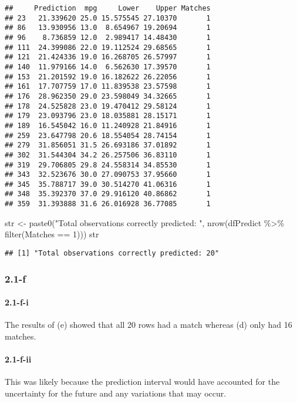 \documentclass[
]{article}
\newenvironment{Shaded}{\begin{snugshade}}{\end{snugshade}}
\newcommand{\DecValTok}[1]{\textcolor[rgb]{0.00,0.00,0.81}{#1}}
\newcommand{\FunctionTok}[1]{\textcolor[rgb]{0.00,0.00,0.00}{#1}}
\newcommand{\NormalTok}[1]{#1}
\newcommand{\OtherTok}[1]{\textcolor[rgb]{0.56,0.35,0.01}{#1}}
\newcommand{\SpecialCharTok}[1]{\textcolor[rgb]{0.00,0.00,0.00}{#1}}
\newcommand{\StringTok}[1]{\textcolor[rgb]{0.31,0.60,0.02}{#1}}
\begin{document}
\begin{verbatim}
##     Prediction  mpg     Lower    Upper Matches
## 23   21.339620 25.0 15.575545 27.10370       1
## 86   13.930956 13.0  8.654967 19.20694       1
## 96    8.736859 12.0  2.989417 14.48430       1
## 111  24.399086 22.0 19.112524 29.68565       1
## 121  21.424336 19.0 16.268705 26.57997       1
## 140  11.979166 14.0  6.562630 17.39570       1
## 153  21.201592 19.0 16.182622 26.22056       1
## 161  17.707759 17.0 11.839538 23.57598       1
## 176  28.962350 29.0 23.598049 34.32665       1
## 178  24.525828 23.0 19.470412 29.58124       1
## 179  23.093796 23.0 18.035881 28.15171       1
## 189  16.545042 16.0 11.240928 21.84916       1
## 259  23.647798 20.6 18.554054 28.74154       1
## 279  31.856051 31.5 26.693186 37.01892       1
## 302  31.544304 34.2 26.257506 36.83110       1
## 319  29.706805 29.8 24.558314 34.85530       1
## 343  32.523676 30.0 27.090753 37.95660       1
## 345  35.788717 39.0 30.514270 41.06316       1
## 348  35.392370 37.0 29.916120 40.86862       1
## 359  31.393888 31.6 26.016928 36.77085       1
\end{verbatim}

\begin{Shaded}
\begin{Highlighting}[]
\NormalTok{str }\OtherTok{\textless{}{-}} \FunctionTok{paste0}\NormalTok{(}\StringTok{"Total observations correctly predicted: "}\NormalTok{, }\FunctionTok{nrow}\NormalTok{(dfPredict }\SpecialCharTok{\%\textgreater{}\%} \FunctionTok{filter}\NormalTok{(Matches }\SpecialCharTok{==} \DecValTok{1}\NormalTok{)))}
\NormalTok{str}
\end{Highlighting}
\end{Shaded}

\begin{verbatim}
## [1] "Total observations correctly predicted: 20"
\end{verbatim}

\hypertarget{f}{%
\subsubsection{2.1-f}\label{f}}

\hypertarget{f-i}{%
\paragraph{2.1-f-i}\label{f-i}}

The results of (e) showed that all 20 rows had a match whereas (d) only
had 16 matches.

\hypertarget{f-ii}{%
\paragraph{2.1-f-ii}\label{f-ii}}

This was likely because the prediction interval would have accounted for
the uncertainty for the future and any variations that may occur.
\end{document}
